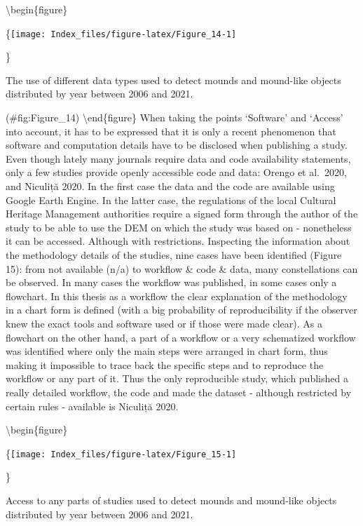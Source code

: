 \documentclass[
]{article}
\begin{document}
\textbackslash begin\{figure\}

\{\centering \texttt{[image: Index\_files/figure-latex/Figure\_14-1]}

\}

\caption{The use of different data types used to detect mounds and mound-like objects distributed by year between 2006 and 2021.}

(\#fig:Figure\_14)
\textbackslash end\{figure\}
When taking the points `Software' and `Access' into account, it has to be expressed that it is only a recent phenomenon that software and computation details have to be disclosed when publishing a study. Even though lately many journals require data and code availability statements, only a few studies provide openly accessible code and data: Orengo et al.~2020, and Niculiță 2020. In the first case the data and the code are available using Google Earth Engine. In the latter case, the regulations of the local Cultural Heritage Management authorities require a signed form through the author of the study to be able to use the DEM on which the study was based on - nonetheless it can be accessed. Although with restrictions.
Inspecting the information about the methodology details of the studies, nine cases have been identified (Figure 15): from not available (n/a) to workflow \& code \& data, many constellations can be observed. In many cases the workflow was published, in some cases only a flowchart. In this thesis as a workflow the clear explanation of the methodology in a chart form is defined (with a big probability of reproducibility if the observer knew the exact tools and software used or if those were made clear). As a flowchart on the other hand, a part of a workflow or a very schematized workflow was identified where only the main steps were arranged in chart form, thus making it impossible to trace back the specific steps and to reproduce the workflow or any part of it. Thus the only reproducible study, which published a really detailed workflow, the code and made the dataset - although restricted by certain rules - available is Niculiță 2020.

\textbackslash begin\{figure\}

\{\centering \texttt{[image: Index\_files/figure-latex/Figure\_15-1]}

\}

\caption{Access to any parts of  studies used to detect mounds and mound-like objects distributed by year between 2006 and 2021.}
\end{document}
